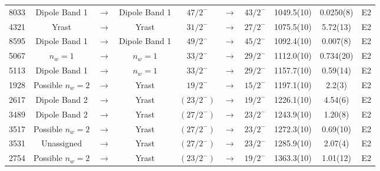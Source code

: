 \begin{landscape}
\begin{center}
\begin{longtable}{|c|ccc|ccc|c|c|c|}
 8033 &Dipole Band 1&$ \rightarrow $&Dipole Band 1&$ 47/2^{-} $&$ \rightarrow $&$ 43/2^{-} $& 1049.5(10) & 0.0250(8) & E2 \\
 4321 &Yrast&$ \rightarrow $&Yrast&$ 31/2^{-} $&$ \rightarrow $&$ 27/2^{-} $& 1075.5(10) & 5.72(13) & E2 \\
 8595 &Dipole Band 1&$ \rightarrow $&Dipole Band 1&$ 49/2^{-} $&$ \rightarrow $&$ 45/2^{-} $& 1092.4(10) & 0.007(8) & E2 \\
 5067 &$n_w=1$&$ \rightarrow $&$n_w=1$&$ 33/2^{-} $&$ \rightarrow $&$ 29/2^{-} $& 1112.0(10) & 0.734(20) & E2 \\
 5113 &Dipole Band 1&$ \rightarrow $&$n_w=1$&$ 33/2^{-} $&$ \rightarrow $&$ 29/2^{-} $& 1157.7(10) & 0.59(14) & E2 \\
 1928 &Possible $n_w=2$&$ \rightarrow $&Yrast&$ 19/2^{-} $&$ \rightarrow $&$ 15/2^{-} $& 1197.1(10) & 2.2(3) & E2 \\
 2617 &Dipole Band 2&$ \rightarrow $&Yrast&$ (23/2^{-}) $&$ \rightarrow $&$ 19/2^{-} $& 1226.1(10) & 4.54(6) & E2 \\
 3489 &Dipole Band 2&$ \rightarrow $&Yrast&$ (27/2^{-}) $&$ \rightarrow $&$ 23/2^{-} $& 1243.9(10) & 1.20(8) & E2 \\
 3517 &Possible $n_w=2$&$ \rightarrow $&Yrast&$ (27/2^{-}) $&$ \rightarrow $&$ 23/2^{-} $& 1272.3(10) & 0.69(10) & E2 \\
 3531 &Unassigned&$ \rightarrow $&Yrast&$ (27/2^{-}) $&$ \rightarrow $&$ 23/2^{-} $& 1285.9(10) & 2.07(4) & E2 \\
 2754 &Possible $n_w=2$&$ \rightarrow $&Yrast&$ (23/2^{-}) $&$ \rightarrow $&$ 19/2^{-} $& 1363.3(10) & 1.01(12) & E2 \\
\hline \hline
\end{longtable}
\end{center}
\end{landscape}